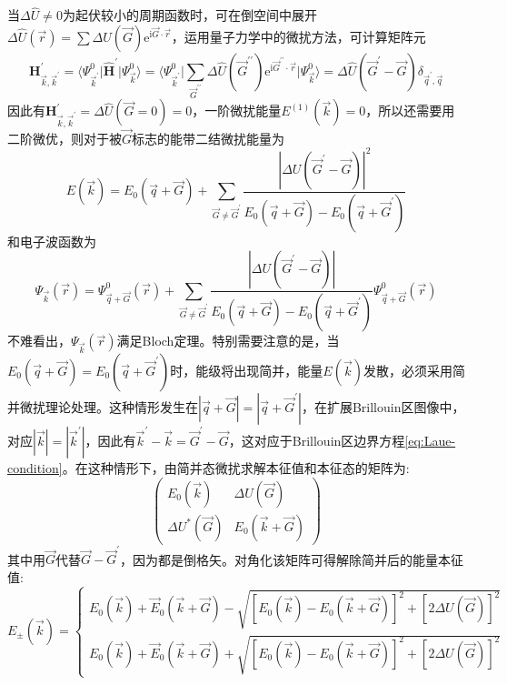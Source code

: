 当$\Delta\hat{U}\neq0$为起伏较小的周期函数时，可在倒空间中展开$\Delta\hat{U}(\vec r)=\sum\Delta U(\vec G)\mathrm{e}^{\mathrm{i}\vec G\cdot\vec r}$，运用量子力学中的微扰方法，可计算矩阵元
\begin{displaymath}
	{\mathbf{H}}_{\vec k,\vec k^{\prime}}^{\prime}=\bigg\langle\Psi_{\vec k^{\prime}}^0\bigg|\hat{\mathbf H}^{\prime}\bigg|\Psi_{\vec k}^0\bigg\rangle=\bigg\langle\Psi_{\vec k^{\prime}}^0\bigg|\sum_{\vec G^{\prime\prime}}\Delta\hat{U}(\vec G^{\prime\prime})\mathrm{e}^{\mathrm{i}\vec G^{\prime\prime}\cdot\vec r}\bigg|\Psi_{\vec k}^0\bigg\rangle=\Delta\hat{U}(\vec G^{\prime}-\vec G)\delta_{\vec q^{\prime},\vec q}
\end{displaymath} 
因此有$\mathbf{H}_{\vec k,\vec k^{\prime}}^{\prime}=\Delta\hat{U}(\vec G=0)=0$，一阶微扰能量$E^{(1)}(\vec k)=0$，所以还需要用二阶微优，则对于被$\vec G$标志的能带二结微扰能量为
\begin{equation}
	E(\vec k)=E_0(\vec q+\vec G)+\sum_{\vec G\neq\vec G^{\prime}}\dfrac{|\Delta U(\vec G^{\prime}-\vec G)|^2}{E_0(\vec q+\vec G)-E_0(\vec q+\vec G^{\prime})}
	\label{eq:Electron-energy-p-2order}
\end{equation}
和电子波函数为
\begin{equation}
	\Psi_{\vec k}(\vec r)=\Psi_{\vec q+\vec G}^0(\vec r)+\sum_{\vec G\neq\vec G^{\prime}}\dfrac{|\Delta U(\vec G^{\prime}-\vec G)|}{E_0(\vec q+\vec G)-E_0(\vec q+\vec G^{\prime})}\Psi_{\vec q+\vec G}^0(\vec r)
	\label{eq:Electron-Wave-p-2order}
\end{equation}
不难看出，$\Psi_{\vec k}(\vec r)$满足Bloch定理。特别需要注意的是，当$E_0(\vec q+\vec G)=E_0(\vec q+\vec G^{\prime})$时，能级将出现简并，能量$E(\vec k)$发散，必须采用简并微扰理论处理。这种情形发生在$|\vec q+\vec G|=|\vec q+\vec G^{\prime}|$，在扩展Brillouin区图像中，对应$|\vec k|=|\vec k^{\prime}|$，因此有$\vec k^{\prime}-\vec k=\vec G^{\prime}-\vec G$，这对应于Brillouin区边界方程\eqref{eq:Laue-condition}。在这种情形下，由简并态微扰求解本征值和本征态的矩阵为:
\begin{displaymath}
	\begin{pmatrix}
		E_0(\vec k) &\Delta U(\vec G)\\
		\Delta U^{\ast}(\vec G) &E_0(\vec k+\vec G)
	\end{pmatrix}
\end{displaymath} 
其中用$\vec G$代替$\vec G-\vec G^{\prime}$，因为都是倒格矢。对角化该矩阵可得解除简并后的能量本征值: 
\begin{equation}
	E_{\pm}(\vec k)=\left\{
		\begin{aligned}
			E_0(\vec k)+\vec E_0(\vec k+\vec G)-\sqrt{[E_0(\vec k)-E_0(\vec k+\vec G)]^2+[2\Delta U(\vec G)]^2}\\
			E_0(\vec k)+\vec E_0(\vec k+\vec G)+\sqrt{[E_0(\vec k)-E_0(\vec k+\vec G)]^2+[2\Delta U(\vec G)]^2}
		\end{aligned}\right.
	\label{eq:degenerate-per-2order}
\end{equation}
